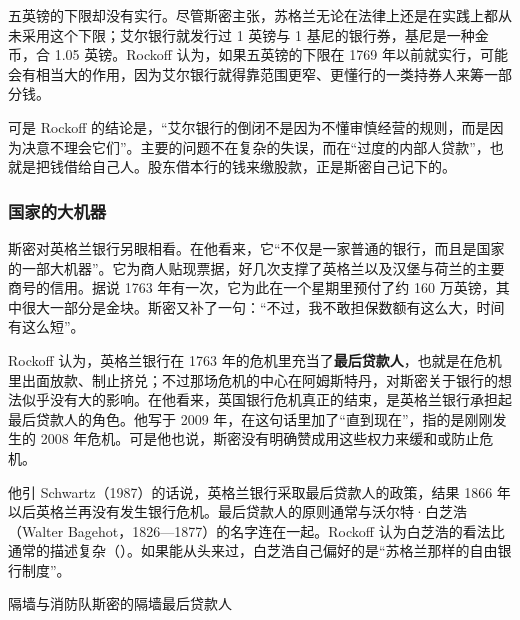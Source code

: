 五英镑的下限却没有实行。尽管斯密主张，苏格兰无论在法律上还是在实践上都从未采用这个下限；艾尔银行就发行过 1 英镑与 1 基尼的银行券，基尼是一种金币，合 1.05 英镑\cite{rockoff2009}。Rockoff 认为，如果五英镑的下限在 1769 年以前就实行，可能会有相当大的作用，因为艾尔银行就得靠范围更窄、更懂行的一类持券人来筹一部分钱\cite{rockoff2009}。

可是 Rockoff 的结论是，“艾尔银行的倒闭不是因为不懂审慎经营的规则，而是因为决意不理会它们”。主要的问题不在复杂的失误，而在“过度的内部人贷款”，也就是把钱借给自己人\cite{rockoff2009}。股东借本行的钱来缴股款，正是斯密自己记下的。

\subsubsection{国家的大机器}
斯密对英格兰银行另眼相看。在他看来，它“不仅是一家普通的银行，而且是国家的一部大机器”。它为商人贴现票据，好几次支撑了英格兰以及汉堡与荷兰的主要商号的信用。据说 1763 年有一次，它为此在一个星期里预付了约 160 万英镑，其中很大一部分是金块。斯密又补了一句：“不过，我不敢担保数额有这么大，时间有这么短”\cite{smith1776}。

Rockoff 认为，英格兰银行在 1763 年的危机里充当了\textbf{最后贷款人}，也就是在危机里出面放款、制止挤兑；不过那场危机的中心在阿姆斯特丹，对斯密关于银行的想法似乎没有大的影响\cite{rockoff2009}。在他看来，英国银行危机真正的结束，是英格兰银行承担起最后贷款人的角色。他写于 2009 年，在这句话里加了“直到现在”，指的是刚刚发生的 2008 年危机。可是他也说，斯密没有明确赞成用这些权力来缓和或防止危机\cite{rockoff2009}。

他引 Schwartz（1987）的话说，英格兰银行采取最后贷款人的政策，结果 1866 年以后英格兰再没有发生银行危机\cite{rockoff2009}。最后贷款人的原则通常与沃尔特·白芝浩（Walter Bagehot，1826—1877）的名字连在一起。Rockoff 认为白芝浩的看法比通常的描述复杂（）。如果能从头来过，白芝浩自己偏好的是“苏格兰那样的自由银行制度”\cite{rockoff2009}。

\begin{compare}{隔墙与消防队}{斯密的隔墙}{最后贷款人}
\end{compare}

